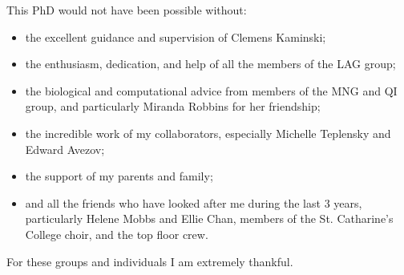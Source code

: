 
\begin{acknowledgements}      

This PhD would not have been possible without:

\begin{itemize}[label={}]
\item the excellent guidance and supervision of Clemens Kaminski;

\item the enthusiasm, dedication, and help of all the members of the LAG group;

\item the biological and computational advice from members of the MNG and QI group, and particularly Miranda Robbins for her friendship;

\item the incredible work of my collaborators, especially Michelle Teplensky and Edward Avezov;

\item the support of my parents and family;

\item and all the friends who have looked after me during the last 3 years, particularly Helene Mobbs and Ellie Chan, members of the St. Catharine's College choir, and the top floor crew.
\end{itemize}

For these groups and individuals I am extremely thankful. 

\end{acknowledgements}
